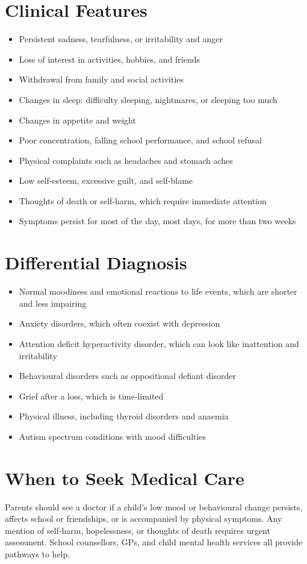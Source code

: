 \section*{Clinical Features}
\begin{itemize}
    \item Persistent sadness, tearfulness, or irritability and anger
    \item Loss of interest in activities, hobbies, and friends
    \item Withdrawal from family and social activities
    \item Changes in sleep: difficulty sleeping, nightmares, or sleeping too much
    \item Changes in appetite and weight
    \item Poor concentration, falling school performance, and school refusal
    \item Physical complaints such as headaches and stomach aches
    \item Low self-esteem, excessive guilt, and self-blame
    \item Thoughts of death or self-harm, which require immediate attention
    \item Symptoms persist for most of the day, most days, for more than two weeks
\end{itemize}

\section*{Differential Diagnosis}
\begin{itemize}
    \item Normal moodiness and emotional reactions to life events, which are shorter and less impairing
    \item Anxiety disorders, which often coexist with depression
    \item Attention deficit hyperactivity disorder, which can look like inattention and irritability
    \item Behavioural disorders such as oppositional defiant disorder
    \item Grief after a loss, which is time-limited
    \item Physical illness, including thyroid disorders and anaemia
    \item Autism spectrum conditions with mood difficulties
\end{itemize}

\section*{When to Seek Medical Care}
Parents should see a doctor if a child's low mood or behavioural change persists, affects school or friendships, or is accompanied by physical symptoms. Any mention of self-harm, hopelessness, or thoughts of death requires urgent assessment. School counsellors, GPs, and child mental health services all provide pathways to help.

